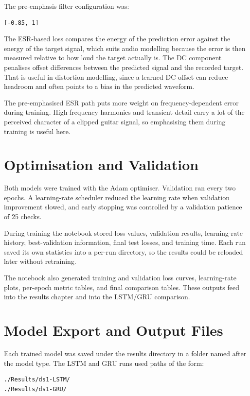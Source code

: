 The pre-emphasis filter configuration was:

\begin{verbatim}
[-0.85, 1]
\end{verbatim}

The ESR-based loss compares the energy of the prediction error against the energy of the target signal, which suits audio modelling because the error is then measured relative to how loud the target actually is. The DC component penalises offset differences between the predicted signal and the recorded target. That is useful in distortion modelling, since a learned DC offset can reduce headroom and often points to a bias in the predicted waveform.

The pre-emphasised ESR path puts more weight on frequency-dependent error during training. High-frequency harmonics and transient detail carry a lot of the perceived character of a clipped guitar signal, so emphasising them during training is useful here.

\section{Optimisation and Validation}

Both models were trained with the Adam optimiser. Validation ran every two epochs. A learning-rate scheduler reduced the learning rate when validation improvement slowed, and early stopping was controlled by a validation patience of 25 checks.

During training the notebook stored loss values, validation results, learning-rate history, best-validation information, final test losses, and training time. Each run saved its own statistics into a per-run directory, so the results could be reloaded later without retraining.

The notebook also generated training and validation loss curves, learning-rate plots, per-epoch metric tables, and final comparison tables. These outputs feed into the results chapter and into the LSTM/GRU comparison.

\section{Model Export and Output Files}

Each trained model was saved under the results directory in a folder named after the model type. The LSTM and GRU runs used paths of the form:

\begin{verbatim}
./Results/ds1-LSTM/
./Results/ds1-GRU/
\end{verbatim}

